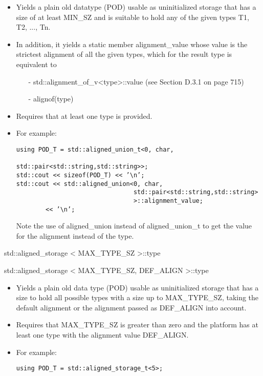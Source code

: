 \begin{itemize}
\item
Yields a plain old datatype (POD) usable as uninitialized storage that has a size of at least MIN\_SZ and is suitable to hold any of the given types T1, T2, ..., Tn.

\item
In addition, it yields a static member alignment\_value whose value is the strictest alignment of all the given types, which for the result type is equivalent to

\begin{itemize}
\item[-]
std::alignment\_of\_v<type>::value (see Section D.3.1 on page 715)

\item[-]
alignof(type)
\end{itemize}

\item
Requires that at least one type is provided.

\item
For example:
\begin{lstlisting}[style=styleCXX]
using POD_T = std::aligned_union_t<0, char,
								std::pair<std::string,std::string>>;
std::cout << sizeof(POD_T) << ’\n’;
std::cout << std::aligned_union<0, char,
								std::pair<std::string,std::string>
								>::alignment_value;
		<< ’\n’;
\end{lstlisting}

Note the use of aligned\_union instead of aligned\_union\_t to get the value for the alignment instead of the type.
\end{itemize}

std::aligned\_storage < MAX\_TYPE\_SZ >::type

std::aligned\_storage < MAX\_TYPE\_SZ, DEF\_ALIGN >::type

\begin{itemize}
\item
Yields a plain old data type (POD) usable as uninitialized storage that has a size to hold all possible types with a size up to MAX\_TYPE\_SZ, taking the default alignment or the alignment passed as DEF\_ALIGN into account.

\item
Requires that MAX\_TYPE\_SZ is greater than zero and the platform has at least one type with the alignment value DEF\_ALIGN.

\item
For example:
\begin{lstlisting}[style=styleCXX]
using POD_T = std::aligned_storage_t<5>;
\end{lstlisting}
\end{itemize}













